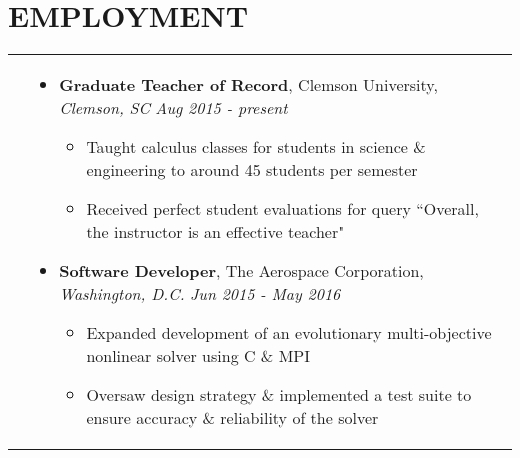 \documentclass[10pt]{article}
\begin{document}
\section{\textbf{EMPLOYMENT}}
\vspace*{-\baselineskip}
\hskip-1.7in
\begin{tabularx}{1.5\linewidth}{>{\raggedleft\scshape}p{3cm}X}

  &\begin{itemize}
    \setlength\itemsep{.005em}

               
                   \setlength\itemsep{.005em}
  \item \textbf{Graduate Teacher of Record}, 
  Clemson University,  \textit{Clemson, SC}  \hspace{22 mm}\textit{Aug 2015 - present}
    \vspace{-2mm}
       \begin{itemize}
           \setlength\itemsep{.005em}
   \item Taught calculus classes for students in science \& engineering to around 45 students per semester
      \item Received perfect student evaluations for query ``Overall, the instructor is an effective teacher"
   \end{itemize}  
 

  \item \textbf{Software Developer}, The Aerospace Corporation, \textit{Washington, D.C.}    \hspace{14 mm}\textit{Jun 2015 - May 2016}
                \vspace{-2mm}
             \begin{itemize}
             \setlength\itemsep{.005em}
   \item Expanded development of an evolutionary multi-objective nonlinear solver using C \& MPI
   
   \item Oversaw design strategy \& implemented a test suite to ensure accuracy \& reliability of the solver
   \end{itemize}  



  \end{itemize} 

\end{tabularx}
\end{document}
